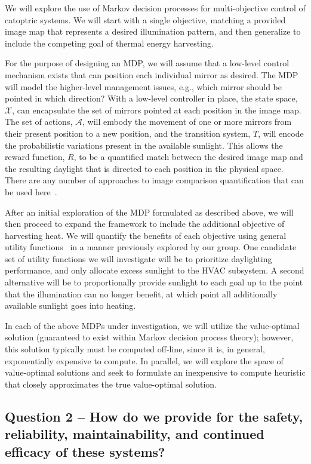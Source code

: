 We will explore the use of Markov decision processes for multi-objective
control of catoptric systems.  We will start with a single objective,
matching a provided image map that represents a desired illumination pattern,
and then generalize to include the competing goal of thermal energy
harvesting.

For the purpose of designing an MDP, we will assume that a low-level
control mechanism exists that can position each individual mirror as
desired.  The MDP will model the higher-level management issues, e.g.,
which mirror should be pointed in which direction?
With a low-level controller in place, the state space, $\mathcal{X}$,
can encapsulate the set of mirrors pointed at each position in
the image map.  The set of actions, $\mathcal{A}$, will embody the movement
of one or more mirrors from their present position to a new position,
and the transition system, $T$, will encode the probabilistic variations
present in the available sunlight.  This allows the reward function, $R$,
to be a quantified match between the desired image map and the resulting
daylight that is directed to each position in the physical space.
There are any number of approaches to image comparison quantification
that can be used here~\cite{ds99,my09,wbo97}.

After an initial exploration of the MDP formulated as described above,
we will then proceed to expand the framework to include the additional
objective of harvesting heat.  We will quantify the benefits of each
objective using general utility functions~\cite{tggs10} in a manner previously
explored by our group. One candidate set of utility functions we will
investigate will be to prioritize daylighting performance, and only
allocate excess sunlight to the HVAC subsystem. A second alternative
will be to proportionally provide sunlight to each goal up to the point
that the illumination can no longer benefit, at which point all additionally
available sunlight goes into heating.

In each of the above MDPs under investigation, we will utilize the
value-optimal solution (guaranteed to exist within Markov decision process
theory); however, this solution typically must be computed off-line, since
it is, in general, exponentially expensive to compute.  In parallel, we
will explore the space of value-optimal solutions and seek to formulate
an inexpensive to compute heuristic that closely approximates the
true value-optimal solution.

\subsection{Question 2 -- How do we provide for the safety, reliability,
maintainability, and continued efficacy of these systems?}

